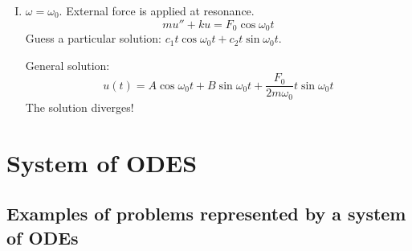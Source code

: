 \documentclass{article}
\newenvironment{enumerateromancap}{\begin{enumerate}[I.] }{\end{enumerate}}
\begin{document}
\begin{enumerate}
\begin{enumerateromancap}
    \begin{center}
    \end{center}
    
    Note: the $\sin \left( \frac{\omega_0 - \omega}{2} t \right)$ term is
    responsible to the outer oscillations and the $\sin \left( \frac{\omega_0
    + \omega}{2} t \right)$ term is responsible to the inner oscillations.
    
    \item $\omega  = \omega_0$. External force is applied at resonance.
    \[ mu'' + ku = F_0 \cos \omega_0 t \]
    Guess a particular solution: $c_1 t \cos \omega_0 t + c_2 t \sin \omega_0
    t$.
    
    General solution:
    \[ u (t) = A \cos \omega_0 t + B \sin \omega_0 t + \frac{F_0}{2 m
       \omega_0} t \sin \omega_0 t \]
    The solution diverges!
    
  \end{enumerateromancap}
\end{enumerate}

\section{System of ODES}

\subsection{Examples of problems represented by a system of ODEs}
\end{document}

